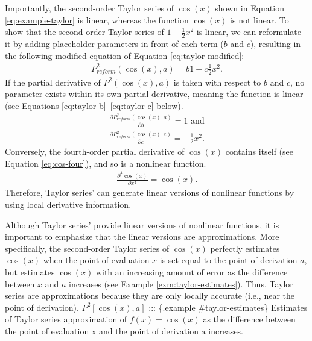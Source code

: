 \documentclass[
12pt, %
twoside,
english]{guelphthesis}
\begin{document}
\noindent Importantly, the second-order Taylor series of \(\cos(x)\) shown in Equation \ref{eq:example-taylor} is linear, whereas the function \(\cos(x)\) is not linear. To show that the second-order Taylor series of \(1- \frac{1}{2}x^2\) is linear, we can reformulate it by adding placeholder parameters in front of each term (\(b\) and \(c\)), resulting in the following modified equation of Equation \ref{eq:taylor-modified}:
\begin{align}
P^2_{reform}(\cos(x), a) = b1- c\frac{1}{2}x^2. 
\label{eq:taylor-modified}
\end{align}
\noindent If the partial derivative of \(P^2(\cos(x), a)\) is taken with respect to \(b\) and \(c\), no parameter exists within its own partial derivative, meaning the function is linear (see Equations \ref{eq:taylor-b}--\ref{eq:taylor-c} below).
\begin{align}
\frac{\partial P^2_{reform}(\cos(x), a)}{\partial b} = 1 \text{ and} \label{eq:taylor-b}\\
\frac{\partial P^2_{reform}(\cos(x), c)}{\partial c} = -\frac{1}{2}x^2. \label{eq:taylor-c}
\end{align}
\noindent Conversely, the fourth-order partial derivative of \(\cos(x)\) contains itself (see Equation \ref{eq:cos-four}), and so is a nonlinear function.
\begin{align}
\frac{\partial^4 \cos(x)}{\partial x^4}  = \cos(x).
\label{eq:cos-four} 
\end{align}
\noindent Therefore, Taylor series' can generate linear versions of nonlinear functions by using local derivative information.

Although Taylor series' provide linear versions of nonlinear functions, it is important to emphasize that the linear versions are approximations. More specifically, the second-order Taylor series of \(\cos(x)\)
perfectly estimates \(\cos(x)\) when the point of evaluation \(x\) is set
equal to the point of derivation \(a\), but estimates \(\cos(x)\) with an
increasing amount of error as the difference between \(x\) and \(a\)
increases (see Example \ref{exm:taylor-estimates}). Thus, Taylor series are approximations because they are only locally accurate (i.e., near the point of derivation).
\(P^2[\cos(x), a]\)
::: \{.example \#taylor-estimates\}
Estimates of Taylor series approximation of \(f(x) = \cos(x)\) as the difference between the point of evaluation \(\mathrm{x}\) and the point of derivation \(\mathrm{a}\) increases.
\end{document}
